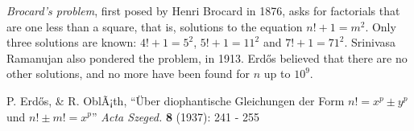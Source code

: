 \documentclass[12pt]{article}
\begin{document}
{\em Brocard's problem}, first posed by Henri Brocard in 1876, asks for factorials that are one less than a square, that is, solutions to the equation $n! + 1 = m^2$. Only three solutions are known: $4! + 1 = 5^2$, $5! + 1 = 11^2$ and $7! + 1 = 71^2$. Srinivasa Ramanujan also pondered the problem, in 1913. Erd\H{o}s believed that there are no other solutions, and no more have been found for $n$ up to $10^9$.

\begin{thebibliography}{1}
 P. Erd\H{o}s, \& R. OblÃ¡th, ``\"Uber diophantische Gleichungen der Form $n! = x^p \pm y^p$ und $n! \pm m! = x^p$'' {\it Acta Szeged.} {\bf 8} (1937): 241 - 255
\end{thebibliography}
\end{document}
